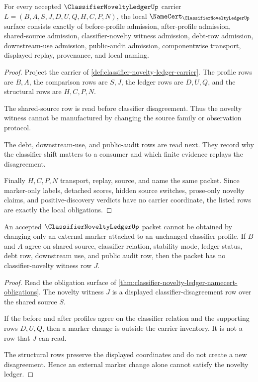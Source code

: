 \begin{theorem}
\label{thm:classifier-novelty-ledger-namecert-obligations}
For every accepted $\ClassifierNoveltyLedgerUp$ carrier $L=(B,A,S,J,D,U,Q,H,C,P,N)$, the local $\NameCert_{\ClassifierNoveltyLedgerUp}$ surface consists exactly of before-profile admission, after-profile admission, shared-source admission, classifier-novelty witness admission, debt-row admission, downstream-use admission, public-audit admission, componentwise transport, displayed replay, provenance, and local naming.
\end{theorem}
\begin{proof}
Project the carrier of \autoref{def:classifier-novelty-ledger-carrier}. The profile rows are $B,A$, the comparison rows are $S,J$, the ledger rows are $D,U,Q$, and the structural rows are $H,C,P,N$.

The shared-source row is read before classifier disagreement. Thus the novelty witness cannot be manufactured by changing the source family or observation protocol.

The debt, downstream-use, and public-audit rows are read next. They record why the classifier shift matters to a consumer and which finite evidence replays the disagreement.

Finally $H,C,P,N$ transport, replay, source, and name the same packet. Since marker-only labels, detached scores, hidden source switches, prose-only novelty claims, and positive-discovery verdicts have no carrier coordinate, the listed rows are exactly the local obligations.
\end{proof}

\begin{theorem}
\label{thm:classifier-novelty-ledger-rejects-marker-only-shifts}
An accepted $\ClassifierNoveltyLedgerUp$ packet cannot be obtained by changing only an external marker attached to an unchanged classifier profile. If $B$ and $A$ agree on shared source, classifier relation, stability mode, ledger status, debt row, downstream use, and public audit row, then the packet has no classifier-novelty witness row $J$.
\end{theorem}
\begin{proof}
Read the obligation surface of \autoref{thm:classifier-novelty-ledger-namecert-obligations}. The novelty witness $J$ is a displayed classifier-disagreement row over the shared source $S$.

If the before and after profiles agree on the classifier relation and the supporting rows $D,U,Q$, then a marker change is outside the carrier inventory. It is not a row that $J$ can read.

The structural rows preserve the displayed coordinates and do not create a new disagreement. Hence an external marker change alone cannot satisfy the novelty ledger.
\end{proof}


